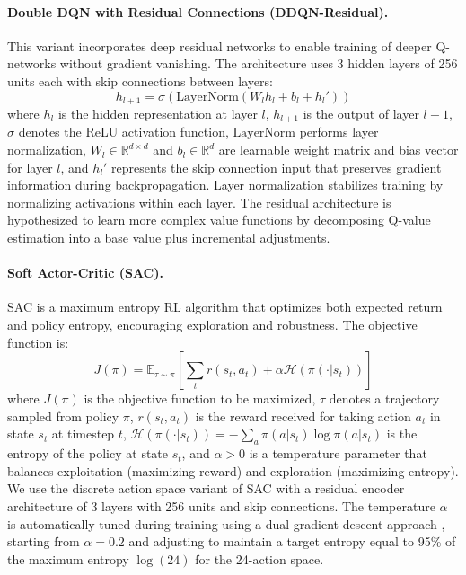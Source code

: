 \paragraph{Double DQN with Residual Connections (DDQN-Residual).}
This variant incorporates deep residual networks \citep{he2016deep} to enable training of deeper Q-networks without gradient vanishing. The architecture uses 3 hidden layers of 256 units each with skip connections between layers:
\begin{equation}
h_{l+1} = \sigma(\text{LayerNorm}(W_l h_l + b_l + h_{l}'))
\label{eq:residual}
\end{equation}
where $h_l$ is the hidden representation at layer $l$, $h_{l+1}$ is the output of layer $l+1$, $\sigma$ denotes the ReLU activation function, $\text{LayerNorm}$ performs layer normalization, $W_l \in \mathbb{R}^{d \times d}$ and $b_l \in \mathbb{R}^d$ are learnable weight matrix and bias vector for layer $l$, and $h_{l}'$ represents the skip connection input that preserves gradient information during backpropagation. Layer normalization stabilizes training by normalizing activations within each layer. The residual architecture is hypothesized to learn more complex value functions by decomposing Q-value estimation into a base value plus incremental adjustments.

\paragraph{Soft Actor-Critic (SAC).}
SAC \citep{haarnoja2018soft} is a maximum entropy RL algorithm that optimizes both expected return and policy entropy, encouraging exploration and robustness. The objective function is:
\begin{equation}
J(\pi) = \mathbb{E}_{\tau \sim \pi}\left[\sum_t r(s_t, a_t) + \alpha \mathcal{H}(\pi(\cdot|s_t))\right]
\label{eq:sac}
\end{equation}
where $J(\pi)$ is the objective function to be maximized, $\tau$ denotes a trajectory sampled from policy $\pi$, $r(s_t, a_t)$ is the reward received for taking action $a_t$ in state $s_t$ at timestep $t$, $\mathcal{H}(\pi(\cdot|s_t)) = -\sum_a \pi(a|s_t) \log \pi(a|s_t)$ is the entropy of the policy at state $s_t$, and $\alpha > 0$ is a temperature parameter that balances exploitation (maximizing reward) and exploration (maximizing entropy). We use the discrete action space variant of SAC with a residual encoder architecture of 3 layers with 256 units and skip connections. The temperature $\alpha$ is automatically tuned during training using a dual gradient descent approach \citep{haarnoja2018soft_applications}, starting from $\alpha = 0.2$ and adjusting to maintain a target entropy equal to 95\% of the maximum entropy $\log(24)$ for the 24-action space.

